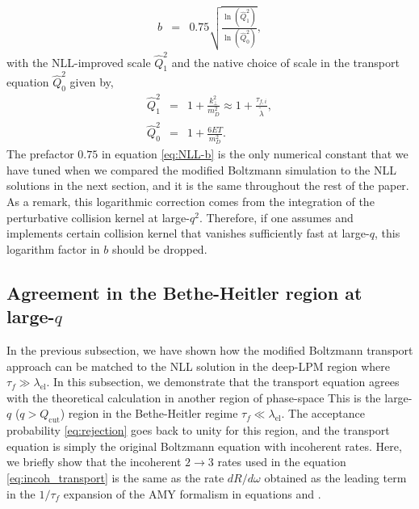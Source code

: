 \documentclass[aps, prc, reprint, amsmath, groupedaddress, nofootinbib]{revtex4-1}
\begin{document}
\begin{eqnarray}
b &=& 0.75\sqrt{\frac{\ln(\hat{Q}_1^2 )}{\ln(\hat{Q}_0^2 )}},
\label{eq:NLL-b}
\end{eqnarray}
with the NLL-improved scale $\hat{Q}_1^2$ and the native choice of scale in the transport equation $\hat{Q}_0^2$ given by,
\begin{eqnarray}
\hat{Q}_1^2 &=& 1 + \frac{k_\perp^2}{m_D^2} \approx 1 + \frac{\tau_{f,i}}{\tilde{\lambda}}, \\ 
\hat{Q}_0^2 &=& 1 + \frac{6ET}{m_D^2}.
\end{eqnarray}
The prefactor $0.75$ in equation \ref{eq:NLL-b} is the only numerical constant that we have tuned when we compared the modified Boltzmann simulation to the NLL solutions in the next section, and it is the same throughout the rest of the paper.
As a remark, this logarithmic correction comes from the integration of the perturbative collision kernel at large-$q^2$.
Therefore, if one assumes and implements certain collision kernel that vanishes sufficiently fast at large-$q$, this logarithm factor in $b$ should be dropped. 

\subsection{Agreement in the Bethe-Heitler region at large-$q$}
In the previous subsection, we have shown how the modified Boltzmann transport approach can be matched to the NLL solution in the deep-LPM region where $\tau_f \gg \lambda_{\textrm{el}}$.
In this subsection, we demonstrate that the transport equation agrees  with the theoretical calculation in another region of phase-space
This is the large-$q$ ($q>Q_{\textrm{cut}}$) region in the Bethe-Heitler regime $\tau_f \ll \lambda_{\textrm{el}}$.
The acceptance probability \ref{eq:rejection} goes back to unity for this region, and the transport equation is simply the original Boltzmann equation with incoherent rates.
Here, we briefly show that the incoherent $2\rightarrow 3$ rates used in the equation \ref{eq:incoh_transport} is the same as the rate $dR/d\omega$ obtained as the leading term in the $1/\tau_f$ expansion of the AMY formalism in equations \label{eq:AMY-1} and \label{eq:AMY-2}.
\end{document}
